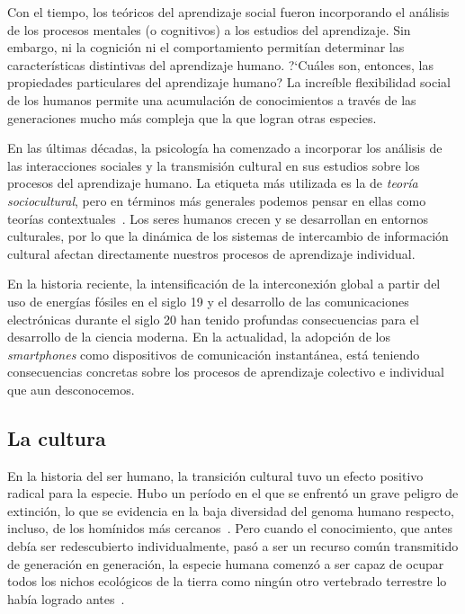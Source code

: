 \documentclass[a4paper,11pt]{book}
\theoremstyle{definition}
\begin{document}

Con el tiempo, los te\'oricos del aprendizaje social fueron incorporando el an\'alisis de los procesos mentales (o cognitivos) a los estudios del aprendizaje.
%
Sin embargo, ni la cognici\'on ni el comportamiento permit\'ian determinar las caracter\'isticas distintivas del aprendizaje humano.
%
?`Cu\'ales son, entonces, las propiedades particulares del aprendizaje humano?
%
La incre\'ible flexibilidad social de los humanos permite una acumulaci\'on de conocimientos a trav\'es de las generaciones mucho m\'as compleja que la que logran otras especies.


En las \'ultimas d\'ecadas, la psicolog\'ia ha comenzado a incorporar los an\'alisis de las interacciones sociales y la transmisi\'on cultural en sus estudios sobre los procesos del aprendizaje humano.
%
La etiqueta m\'as utilizada es la de \emph{teor\'ia sociocultural}, pero en t\'erminos m\'as generales podemos pensar en ellas como teor\'ias contextuales~\cite{Ormrod2017}.
%
Los seres humanos crecen y se desarrollan en entornos culturales, por lo que la din\'amica de los sistemas de intercambio de informaci\'on cultural afectan directamente nuestros procesos de aprendizaje individual.


En la historia reciente, la intensificaci\'on de la interconexi\'on global a partir del uso de energ\'ias f\'osiles en el siglo 19 y el desarrollo de las comunicaciones electr\'onicas durante el siglo 20 han tenido profundas consecuencias para el desarrollo de la ciencia moderna.
%
En la actualidad, la adopci\'on de los \emph{smartphones} como dispositivos de comunicaci\'on instant\'anea, est\'a teniendo consecuencias concretas sobre los procesos de aprendizaje colectivo e individual que aun desconocemos.

\subsection{La cultura}

En la historia del ser humano, la transici\'on cultural tuvo un efecto positivo radical para la especie.
%
Hubo un per\'iodo en el que se enfrent\'o un grave peligro de extinci\'on, lo que se evidencia en la baja diversidad del genoma humano respecto, incluso, de los hom\'inidos m\'as cercanos~\cite{Hrdy2009}.
%
Pero cuando el conocimiento, que antes deb\'ia ser redescubierto individualmente, pas\'o a ser un recurso com\'un transmitido de generaci\'on en generaci\'on, la especie humana comenz\'o a ser capaz de ocupar todos los nichos ecol\'ogicos de la tierra como ning\'un otro vertebrado terrestre lo hab\'ia logrado antes~\cite{Boyd2011}.
\end{document}
